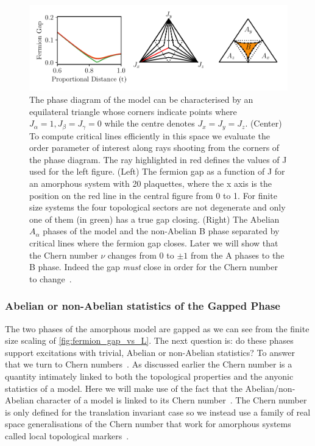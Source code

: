 \hypertarget{fig:phase_diagram}{%
\begin{figure}
\centering
\includegraphics[width=1\textwidth,height=\textheight]{figure_code/amk_chapter/results/phase_diagram/phase_diagram}
\caption[{The Ground State Phase Diagram}]{The phase diagram of the model can be characterised by an equilateral triangle whose corners indicate points where \(J_\alpha = 1, J_\beta = J_\gamma = 0\) while the centre denotes \(J_x = J_y = J_z\). (Center) To compute critical lines efficiently in this space we evaluate the order parameter of interest along rays shooting from the corners of the phase diagram. The ray highlighted in red defines the values of J used for the left figure. (Left) The fermion gap as a function of J for an amorphous system with 20 plaquettes, where the x axis is the position on the red line in the central figure from 0 to 1. For finite size systems the four topological sectors are not degenerate and only one of them (in green) has a true gap closing. (Right) The Abelian \(A_\alpha\) phases of the model and the non-Abelian B phase separated by critical lines where the fermion gap closes. Later we will show that the Chern number \(\nu\) changes from \(0\) to \(\pm 1\) from the A phases to the B phase. Indeed the gap \emph{must} close in order for the Chern number to change~\autocite{ezawaTopologicalPhaseTransition2013}.}
\label{fig:phase_diagram}
\end{figure}
}

\hypertarget{abelian-or-non-abelian-statistics-of-the-gapped-phase}{%
\subsubsection{Abelian or non-Abelian statistics of the Gapped Phase}\label{abelian-or-non-abelian-statistics-of-the-gapped-phase}}

The two phases of the amorphous model are gapped as we can see from the finite size scaling of \cref{fig:fermion_gap_vs_L}. The next question is: do these phases support excitations with trivial, Abelian or non-Abelian statistics? To answer that we turn to Chern numbers~\autocite{berryQuantalPhaseFactors1984,simonHolonomyQuantumAdiabatic1983,thoulessQuantizedHallConductance1982}. As discussed earlier the Chern number is a quantity intimately linked to both the topological properties and the anyonic statistics of a model. Here we will make use of the fact that the Abelian/non-Abelian character of a model is linked to its Chern number~\autocite{kitaevAnyonsExactlySolved2006}. The Chern number is only defined for the translation invariant case so we instead use a family of real space generalisations of the Chern number that work for amorphous systems called local topological markers~\autocite{bianco_mapping_2011,Hastings_Almost_2010,mitchellAmorphousTopologicalInsulators2018}.

